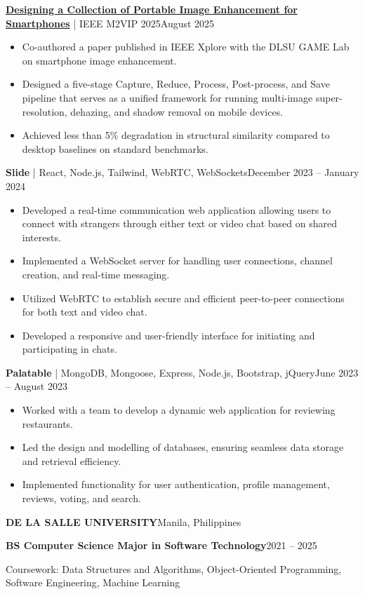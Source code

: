 \documentclass[10pt,letterpaper]{article}
\newcommand{\gap}{\par\vspace{\baselineskip}}
\newcommand{\heading}[1]{\gap{\centering\textbf{#1}\par}\vspace{\baselineskip}}
\newcommand{\role}[4]{\textbf{#1}\hfill #2\par\textbf{#3}\hfill #4\par}
\newcommand{\project}[3]{\textbf{#1} | #2\hfill #3\par}
\begin{document}
\heading{Projects}

\project{\href{https://doi.org/10.1109/M2VIP67511.2025.11165605}{Designing a Collection of Portable Image Enhancement for Smartphones}}
  {IEEE M2VIP 2025}{August 2025}
\begin{itemize}
  \item Co-authored a paper published in IEEE Xplore with the DLSU GAME Lab on smartphone image enhancement.
  \item Designed a five-stage Capture, Reduce, Process, Post-process, and Save pipeline that serves as a unified framework
    for running multi-image super-resolution, dehazing, and shadow removal on mobile devices.
  \item Achieved less than 5\% degradation in structural similarity compared to desktop baselines on standard benchmarks.
\end{itemize}
\gap

\project{Slide}{React, Node.js, Tailwind, WebRTC, WebSockets}{December 2023 -- January 2024}
\begin{itemize}
  \item Developed a real-time communication web application allowing users to connect with strangers through either text
    or video chat based on shared interests.
  \item Implemented a WebSocket server for handling user connections, channel creation, and real-time messaging.
  \item Utilized WebRTC to establish secure and efficient peer-to-peer connections for both text and video chat.
  \item Developed a responsive and user-friendly interface for initiating and participating in chats.
\end{itemize}
\gap

\project{Palatable}{MongoDB, Mongoose, Express, Node.js, Bootstrap, jQuery}{June 2023 -- August 2023}
\begin{itemize}
  \item Worked with a team to develop a dynamic web application for reviewing restaurants.
  \item Led the design and modelling of databases, ensuring seamless data storage and retrieval efficiency.
  \item Implemented functionality for user authentication, profile management, reviews, voting, and search.
\end{itemize}

\heading{Education}

\role{DE LA SALLE UNIVERSITY}{Manila, Philippines}
  {BS Computer Science Major in Software Technology}{2021 -- 2025}
Coursework: Data Structures and Algorithms, Object-Oriented Programming, Software Engineering, Machine Learning
\end{document}
